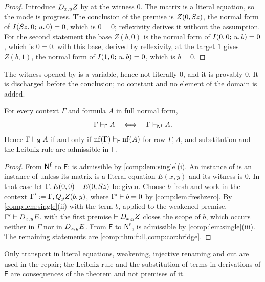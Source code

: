 \begin{proof}
Introduce $D_{x,y}Z$ by  at the witness $0$. The matrix is a
literal equation, so the mode is progress. The conclusion of the premise is
$Z(0,S z)$, the normal form of $I(S z,0;\,u.\,0)=0$, which is $0=0$;
reflexivity derives it without the assumption. For the second statement the
base $Z(b,0)$ is the normal form of $I(0,0;\,u.\,b)=0$, which is $0=0$.
 with this base, derived by reflexivity, at the target $1$
gives $Z(b,1)$, the normal form of $I(1,0;\,u.\,b)=0$, which is $b=0$.
\end{proof}

The witness opened by  is a variable, hence not literally $0$,
and it is provably $0$. It is discharged before the conclusion; no constant
and no element of the domain is added.

\begin{theorem}
\label{comp:thm:fsix}
For every context $\Gamma$ and formula $A$ in full normal form,
\[
 \Gamma\vdash_{\mathsf F}A
 \quad\Longleftrightarrow\quad
 \Gamma\vdash_{\mathsf{N}^{\mathrm f}}A .
\]
Hence $\Gamma\vdash_{\mathsf{N}}A$ if and only if
$\operatorname{nf}(\Gamma)\vdash_{\mathsf F}\operatorname{nf}(A)$ for raw $\Gamma,A$, and substitution
and the Leibniz rule are admissible in $\mathsf{F}$.
\end{theorem}

\begin{proof}
From $\mathsf{N}^{\mathrm f}$ to $\mathsf{F}$:  is admissible by
\cref{comp:lem:single}(i). An instance of  is an instance of
 unless its matrix is a literal equation $E(x,y)$ and its
witness is $0$. In that case let $\Gamma,E(0,0)\vdash E(0,S z)$ be
given. Choose $b$ fresh and work in the context
$\Gamma'\mathrel{:=}\Gamma,Q_{y}Z(b,y)$, where $\Gamma'\vdash b=0$ by
\cref{comp:lem:freshzero}. By \cref{comp:lem:single}(ii) with the term $b$,
applied to the weakened premise, $\Gamma'\vdash D_{x,y}E$. 
with the first premise $\vdash D_{x,y}Z$ closes the scope of $b$, which
occurs neither in $\Gamma$ nor in $D_{x,y}E$. From $\mathsf{F}$ to
$\mathsf{N}^{\mathrm f}$,  is admissible by
\cref{comp:lem:single}(iii). The remaining statements are
\cref{comp:thm:full,comp:cor:bridge}.
\end{proof}

Only transport in literal equations, weakening, injective renaming and cut
are used in the repair; the Leibniz rule and the substitution of terms in
derivations of $\mathsf{F}$ are consequences of the theorem and not
premises of it.

